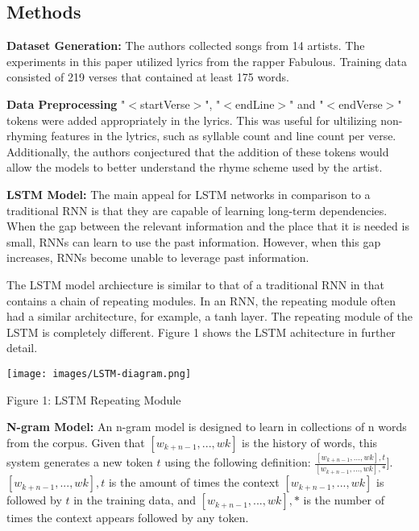 \documentclass{article}
\begin{document}
\begin{item}
\section{Methods}
\item \textbf{Dataset Generation:} The authors collected songs from 14 artists. The experiments in this paper utilized lyrics from the rapper Fabulous. Training data consisted of 219 verses that contained at least 175 words. 

\item \textbf{Data Preprocessing} "$<$startVerse$>$", "$<$endLine$>$" and "$<$endVerse$>$" tokens were added appropriately in the lyrics. This was useful for ultilizing non-rhyming features in the lytrics, such as syllable count and line count per verse. Additionally, the authors conjectured that the addition of these tokens would allow the models to better understand the rhyme scheme used by the artist. 

\item \textbf{LSTM Model:} 
The main appeal for LSTM networks in comparison to a traditional RNN is that they are capable of learning long-term dependencies. When the gap between the relevant information and the place that it is needed is small, RNNs can learn to use the past information. However, when this gap increases, RNNs become unable to leverage past information. 

The LSTM model archiecture is similar to that of a traditional RNN in that contains a chain of repeating modules. In an RNN, the repeating module often had a similar architecture, for example, a tanh layer. The repeating module of the LSTM is completely different. Figure 1 shows the LSTM achitecture in further detail.

\texttt{[image: images/LSTM-diagram.png]}

\centering \caption{Figure 1: LSTM Repeating Module}

\item \textbf{N-gram Model:}  
An n-gram model is designed to learn in collections of n words from the corpus. Given that $[w_{k+n-1},..., w{k}]$ is the history of words, this system generates a new token $t$ using the following definition:
$\frac{[w_{k+n-1},..., w{k}], t}{[w_{k+n-1},..., w{k}], *}$]. $[w_{k+n-1},..., w{k}], t$ is the amount of times the context $[w_{k+n-1},..., w{k}]$ is followed by $t$ in the training data, and $[w_{k+n-1},..., w{k}], *$ is the number of times the context appears followed by any token. 

\end{item}
\end{document}
